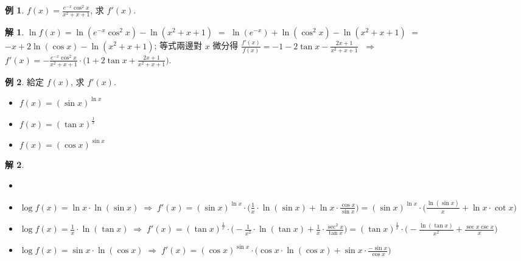 \documentclass[12pt]{extarticle}
\newcommand{\ds}{\displaystyle}
\newcommand{\ie}{\;\Longrightarrow\;}
\theoremstyle{definition}
\newtheorem*{ex}{例}
\newtheorem*{sol}{解}
\begin{document}
\begin{ex}
  $\ds f(x) = \frac{e^{-x}\cos^2 x}{x^2 + x + 1}$, 求 $f'(x)$. 
\end{ex}

\begin{sol}
  $\ds\ln f(x) = \ln(e^{-x}\cos^2 x) - \ln(x^2 + x + 1)$ $=$ $\ds\ln(e^{-x}) + \ln(\cos^2 x) - \ln(x^2 + x + 1)$ $=$ $\ds -x + 2\ln(\cos x) - \ln(x^2 + x + 1)$; 等式兩邊對 $x$ 微分得 $\ds\frac{f'(x)}{f(x)} = -1 - 2\tan x - \frac{2x + 1}{x^2 + x + 1}$ $\ie$ $\ds f'(x) = -\frac{e^{-x}\cos^2 x}{x^2 + x + 1}\cdot\Big(1 + 2\tan x + \frac{2x + 1}{x^2 + x + 1}\Big)$. 
\end{sol}

\begin{ex} 給定 $f(x)$, 求 $f'(x)$.
  \setlength{\columnsep}{5mm}
  \begin{multicols}{3}
    \begin{itemize}\setlength\itemsep{0em}
      \item $\ds f(x) = (\sin x)^{\ln x}$
      \item $\ds f(x) = (\tan x)^{\frac{1}{x}}$
      \item $\ds f(x) = (\cos x)^{\sin x}$
    \end{itemize}
  \end{multicols}
\end{ex}

\begin{sol}
  \begin{itemize}\setlength\itemsep{0em}
    \item[]
    \item $\ds\log f(x) = \ln x\cdot\ln(\sin x)\ie f'(x) = (\sin x)^{\ln x}\cdot\Big(\frac{1}{x}\cdot\ln(\sin x) + \ln x\cdot\frac{\cos x}{\sin x}\Big) = (\sin x)^{\ln x}\cdot\Big(\frac{\ln(\sin x)}{x} + \ln x\cdot\cot x\Big)$
    \item $\ds\log f(x) = \frac{1}{x}\cdot\ln(\tan x)\ie f'(x) = (\tan x)^{\frac{1}{x}}\cdot\Big(-\frac{1}{x^2}\cdot\ln(\tan x) + \frac{1}{x}\cdot\frac{\sec^2 x}{\tan x}\Big) = (\tan x)^{\frac{1}{x}}\cdot\Big(-\frac{\ln(\tan x)}{x^2} + \frac{\sec x\csc x}{x}\Big)$
    \item $\ds\log f(x) = \sin x\cdot\ln(\cos x)\ie f'(x) = (\cos x)^{\sin x}\cdot\Big(\cos x\cdot\ln(\cos x) + \sin x\cdot\frac{-\sin x}{\cos x}\Big)$
  \end{itemize}
\end{sol}
\end{document}
